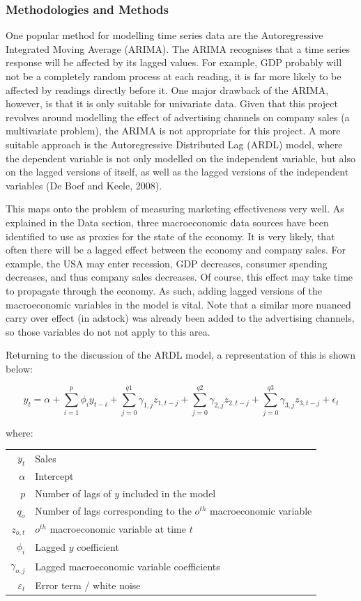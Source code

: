 \documentclass[11pt, a4paper]{article}
\begin{document}
\subsubsection{Methodologies and Methods}

One popular method for modelling time series data are the Autoregressive Integrated Moving Average (ARIMA). The ARIMA recognises that a time series response will be affected by its lagged values. For example, GDP probably will not be a completely random process at each reading, it is far more likely to be affected by readings directly before it. One major drawback of the ARIMA, however, is that it is only suitable for univariate data. Given that this project revolves around modelling the effect of advertising channels on company sales (a multivariate problem), the ARIMA is not appropriate for this project. A more suitable approach is the Autoregressive Distributed Lag (ARDL) model, where the dependent variable is not only modelled on the independent variable, but also on the lagged versions of itself, as well as the lagged versions of the independent variables (De Boef and Keele, 2008). 

This maps onto the problem of measuring marketing effectiveness very well. As explained in the Data section, three macroeconomic data sources have been identified to use as proxies for the state of the economy. It is very likely, that often there will be a lagged effect between the economy and company sales. For example, the USA may enter recession, GDP decreases, consumer spending decreases, and thus company sales decreases. Of course, this effect may take time to propagate through the economy. As such, adding lagged versions of the macroeconomic variables in the model is vital. Note that a similar more nuanced carry over effect (in adstock) was already been added to the advertising channels, so those variables do not not apply to this area. 

Returning to the discussion of the ARDL model, a representation of this is shown below:

\begin{equation}
y_{t} = \alpha + \sum_{i=1}^{p}\phi_{i}y_{t-i} + \sum_{j=0}^{q1}\gamma_{1,j}z_{1,t-j} +
\sum_{j=0}^{q2}\gamma_{2,j}z_{2,t-j} +
\sum_{j=0}^{q3}\gamma_{3,j}z_{3,t-j} + 
\epsilon_{t}
\end{equation}

where:

\hspace{1cm}
\begin{tabular}{r@{ : }l}
$y_t$ & Sales \\
$\alpha$ & Intercept \\
$p$ & Number of lags of $y$ included in the model \\
$q_o$ & Number of lags corresponding to the $o^{th}$ macroeconomic variable \\
$z_{o,t}$ & $o^{th}$ macroeconomic variable at time $t$ \\
$\phi_i$ & Lagged $y$ coefficient \\
$\gamma_{o,j}$ & Lagged macroeconomic variable coefficients \\
$\varepsilon_t$ & Error term / white noise
\end{tabular}
\end{document}

